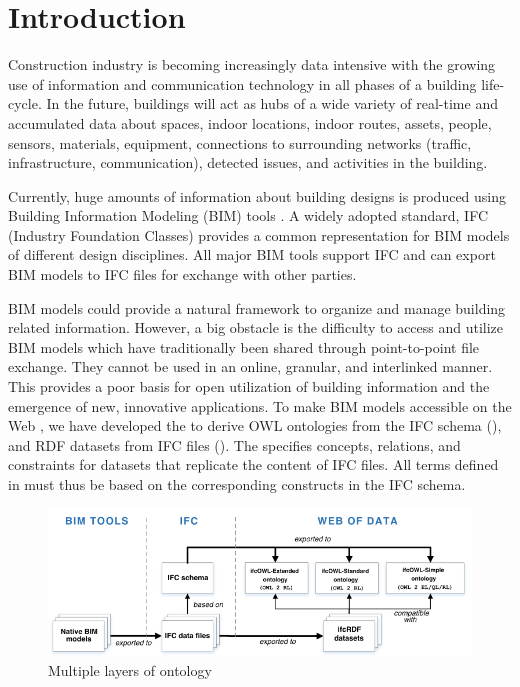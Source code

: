 \section{Introduction}
\label{sec:Introduction}

Construction industry is becoming increasingly data intensive with the growing use of
information and communication technology in all phases of a building life-cycle. 
In the future, buildings will act as hubs of a wide variety of real-time and accumulated data about
spaces, indoor locations, indoor routes, assets, people, sensors, materials, equipment, connections
to surrounding networks (traffic, infrastructure, communication), detected issues, and 
activities in the building.

Currently, huge amounts of information about building designs is produced  
using Building Information Modeling (BIM) tools \cite{eastman2011bim}. A widely adopted standard, 
IFC (Industry Foundation Classes) \cite{ISO16739,liebich2010unveiling} provides a common representation for BIM models of 
different design disciplines. All major BIM tools support IFC and can export BIM models to IFC files for exchange with other parties.

BIM models could provide a natural framework to organize and manage building related information. However, a big obstacle is the difficulty to access and utilize BIM models which have traditionally been shared through point-to-point file exchange. They cannot be used in an online, granular, and 
interlinked manner. This provides a poor basis for open utilization of building information and the 
emergence of new, innovative applications.
To make BIM models accessible on the Web \cite{torma2014wobd}, we have developed the 
 to 
derive OWL ontologies from the IFC schema (\ifcowl{}), and RDF datasets from IFC files 
(\ifcrdf{}). The \ifcowl{} specifies concepts, relations, and constraints for \ifcrdf{} datasets that replicate the content of IFC files. 
All terms defined in \ifcowl{}  must thus be based on the corresponding constructs in 
the IFC schema. 

\begin{figure}[h]
\centering
\includegraphics[angle=0,width=1.0\textwidth]{images/ifcOWL-multilayers.png}
\caption{Multiple layers of \ifcowl{} ontology}
\label{fig:ifcOWL-layers}
\end{figure}

